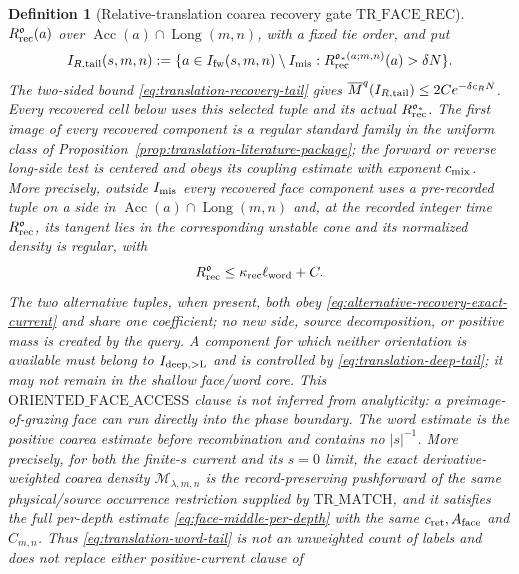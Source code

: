 \documentclass[11pt]{article}
\newtheorem{definition}[theorem]{Definition}
\begin{document}
\begin{definition}[Relative-translation coarea recovery gate
$\mathrm{TR\_FACE\_REC}$]
$R_{\rm rec}^{\mathfrak o}(a)$ over
$\operatorname{Acc}(a)\cap\operatorname{Long}(m,n)$, with a fixed tie
order, and put
\begin{equation}
\label{eq:translation-active-recovery-tail}
 I_{R,\rm tail}(s,m,n):=
 \{a\in I_{\rm fw}(s,m,n)\setminus I_{\rm mis}:
   R_{\rm rec}^{\mathfrak o_*(a;m,n)}(a)>\delta N\}.
\end{equation}
The two-sided bound \eqref{eq:translation-recovery-tail} gives
$\overline M^q(I_{R,\rm tail})\le 2Ce^{-\delta c_RN}$.  Every recovered
cell below uses this selected tuple and its actual
$R_{\rm rec}^{\mathfrak o_*}$.
The first image of every recovered component is a regular standard family
in the uniform class of Proposition~\ref{prop:translation-literature-package};
the forward or reverse long-side test is centered and obeys its coupling
estimate with exponent $c_{\rm mix}$.  More precisely, outside
$I_{\rm mis}$ every recovered face component uses a pre-recorded tuple on a
side in $\operatorname{Acc}(a)\cap\operatorname{Long}(m,n)$ and, at
the recorded integer time $R_{\rm rec}^{\mathfrak o}$, its tangent lies in the
corresponding unstable cone and its normalized density is regular, with
\begin{equation}
\label{eq:translation-recorded-recovery-clock}
 R_{\rm rec}^{\mathfrak o}
 \le \kappa_{\rm rec}\ell_{\rm word}+C.
\end{equation}
The
two alternative tuples, when present, both obey
\eqref{eq:alternative-recovery-exact-current} and share one coefficient;
no new side, source decomposition, or positive mass is created by the
query.  A component for which neither
orientation is available must belong to $I_{\rm deep,>L}$ and is controlled by
\eqref{eq:translation-deep-tail}; it may not remain in the shallow
face/word core.  This
$\mathrm{ORIENTED\_FACE\_ACCESS}$ clause is not inferred from analyticity:
a preimage-of-grazing face can run directly into the phase boundary.  The
word estimate is the positive coarea estimate before recombination and
contains no $|s|^{-1}$.  More precisely, for both the finite-$s$ current
and its $s=0$ limit, the exact derivative-weighted coarea density
$\mathcal M_{\lambda,m,n}$ is the record-preserving pushforward of the same
physical/source occurrence restriction supplied by $\mathrm{TR\_MATCH}$,
and it satisfies the full per-depth estimate
\eqref{eq:face-middle-per-depth} with the same
$c_{\rm ret},A_{\rm face}$ and $C_{m,n}$.  Thus
\eqref{eq:translation-word-tail} is not an unweighted count of labels and
does not replace either positive-current clause of

\end{definition}
\end{document}
